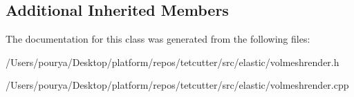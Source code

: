 \subsection*{Additional Inherited Members}


The documentation for this class was generated from the following files\+:\begin{DoxyCompactItemize}
\item 
/\+Users/pourya/\+Desktop/platform/repos/tetcutter/src/elastic/volmeshrender.\+h\item 
/\+Users/pourya/\+Desktop/platform/repos/tetcutter/src/elastic/volmeshrender.\+cpp\end{DoxyCompactItemize}

